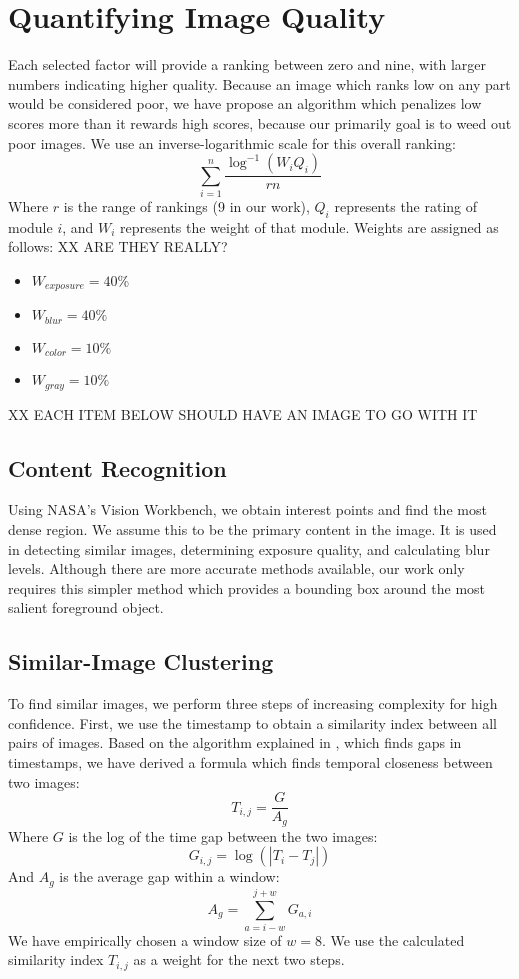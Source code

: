 \documentclass[twocolumn]{article}
\begin{document}
\section{Quantifying Image Quality}
Each selected factor will provide a ranking between zero and nine, with larger numbers indicating higher quality. Because an image which ranks low on any part would be considered poor, we have propose an algorithm which penalizes low scores more than it rewards high scores, because our primarily goal is to weed out poor images. We use an inverse-logarithmic scale for this overall ranking:
\[
\displaystyle\sum\limits_{i=1}^n\frac{\log^{-1}(W_iQ_i)}{rn}
\]
Where \(r\) is the range of rankings (9 in our work), \(Q_i\) represents the rating of module \(i\), and \(W_i\) represents the weight of that module. Weights are assigned as follows: XX ARE THEY REALLY?
\begin{itemize}
\item \(W_{exposure}=40\%\)
\item \(W_{blur}=40\%\)
\item \(W_{color}=10\%\)
\item \(W_{gray}=10\%\)
\end{itemize}

XX EACH ITEM BELOW SHOULD HAVE AN IMAGE TO GO WITH IT

\subsection{Content Recognition}
Using NASA's Vision Workbench\cite{vision-workbench}, we obtain interest points and find the most dense region. We assume this to be the primary content in the image. It is used in detecting similar images, determining exposure quality, and calculating blur levels. Although there are more accurate methods available\cite{5649226}, our work only requires this simpler method which provides a bounding box around the most salient foreground object.

\subsection{Similar-Image Clustering}
To find similar images, we perform three steps of increasing complexity for high confidence.
First, we use the timestamp to obtain a similarity index between all pairs of images. Based on the algorithm explained in \cite{1292402}, which finds gaps in timestamps, we have derived a formula which finds temporal closeness between two images:
\[
T_{i,j}=\frac{G}{A_g}
\]
Where \(G\) is the log of the time gap between the two images:
\[
G_{i,j}=\log(|T_i-T_j|)
\]
And \(A_g\) is the average gap within a window:
\[
A_g=\displaystyle\sum\limits_{a={i-w}}^{j+w}G_{a,i}
\]
We have empirically chosen a window size of \(w=8\).
We use the calculated similarity index \(T_{i,j}\) as a weight for the next two steps.
\end{document}
